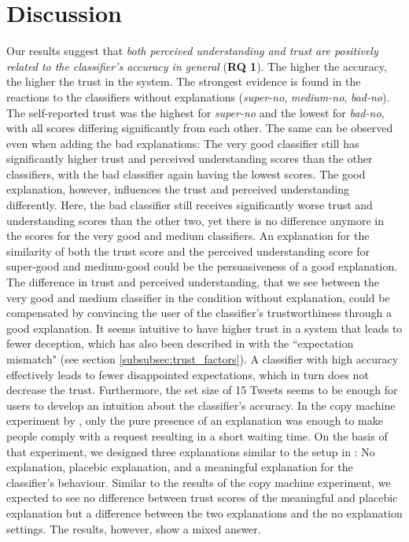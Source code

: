 \section{Discussion}
Our results suggest that \textit{both perceived understanding and trust are positively related to the classifier's accuracy in general} (\textbf{RQ 1}). The higher the accuracy, the higher the trust in the system. The strongest evidence is found in the reactions to the classifiers without explanations (\textit{super-no}, \textit{medium-no}, \textit{bad-no}). The self-reported trust was the highest for \textit{super-no} and the lowest for \textit{bad-no}, with all scores differing significantly from each other. The same can be observed even when adding the bad explanations: The very good classifier still has significantly higher trust and perceived understanding scores than the other classifiers, with the bad classifier again having the lowest scores. The good explanation, however, influences the trust and perceived understanding differently. Here, the bad classifier still receives significantly worse trust and understanding scores than the other two, yet there is no difference anymore in the scores for the very good and medium classifiers. \newline
An explanation for the similarity of both the trust score and the perceived understanding score for super-good and medium-good could be the persuasiveness of a good explanation. The difference in trust and perceived understanding, that we see between the very good and medium classifier in the condition without explanation, could be compensated by convincing the user of the classifier's trustworthiness through a good explanation.\newline
It seems intuitive to have higher trust in a system that leads to fewer deception, which has also been described in \cite{glass2008toward} with the ``expectation mismatch" (see section \ref{subsubsec:trust_factors}). A classifier with high accuracy effectively leads to fewer disappointed expectations, which in turn does not decrease the trust. Furthermore, the set size of 15 Tweets seems to be enough for users to develop an intuition about the classifier's accuracy. \medskip \newline
In the copy machine experiment by \cite{langer1978mindlessness}, only the pure presence of an explanation was enough to make people comply with a request resulting in a short waiting time. On the basis of that experiment, we designed three explanations similar to the setup in \cite{langer1978mindlessness}: No explanation, placebic explanation, and a meaningful explanation for the classifier's behaviour. Similar to the results of the copy machine experiment, we expected to see no difference between trust scores of the meaningful and placebic explanation but a difference between the two explanations and the no explanation settings. The results, however, show a mixed answer.\newline
